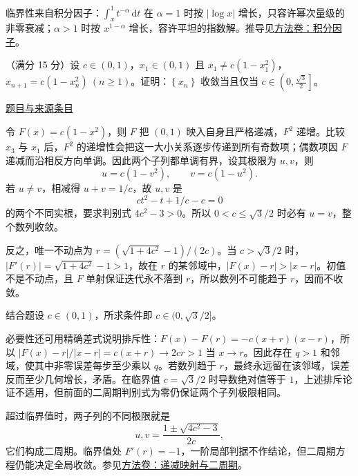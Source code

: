 \documentclass[12pt,fontset=fandol]{ctexart}
\begin{document}
\begin{remark}[方法与条件]临界性来自积分因子：$\int_x^1t^{-\alpha}\,\mathrm dt$ 在 $\alpha=1$ 时按 $|\log x|$ 增长，只容许幂次量级的非零衰减；$\alpha>1$ 时按 $x^{1-\alpha}$ 增长，容许平坦的指数解。推导见\hyperref[app:dynamics-factor]{方法卷：积分因子}。\end{remark}

\begin{example}\label{ex:fin10-lo:8}\label{pr:fin10-lo:8}

（满分 15 分）设 $c\in(0,1)$，$x_{1}\in(0,1)$ 且 $x_{1}\neq c\left(1-x_{1}^{2}\right)$，$x_{n+1}=c\left(1-x_{n}^{2}\right)\ (n\geq1)$。证明：$\left\{x_{n}\right\}$ 收敛当且仅当 $c\in\left(0,\frac{\sqrt{3}}{2}\right]$。

\par\href{https://github.com/lzxcr/cmc-mathematics/blob/64916fa1fdbc3e444a652eca204d5669058ee321/src/problems/finals/10/08.md}{题目与来源条目}

\end{example}

\begin{solve}\label{ans:fin10-lo:8}

令 $F(x)=c(1-x^2)$，则 $F$ 把 $(0,1)$ 映入自身且严格递减，$F^2$ 递增。比较 $x_3$ 与 $x_1$ 后，$F^2$ 的递增性会把这一大小关系逐步传递到所有奇数项；偶数项因 $F$ 递减而沿相反方向单调。因此两个子列都单调有界，设其极限为 $u,v$，则
\[
u=c(1-v^2),\qquad v=c(1-u^2).
\]
若 $u\ne v$，相减得 $u+v=1/c$，故 $u,v$ 是
\[
ct^2-t+1/c-c=0
\]
的两个不同实根，要求判别式 $4c^2-3>0$。所以 $0<c\leq\sqrt3/2$ 时必有 $u=v$，整个数列收敛。

反之，唯一不动点为 $r=(\sqrt{1+4c^2}-1)/(2c)$。当 $c>\sqrt3/2$ 时，$|F'(r)|=\sqrt{1+4c^2}-1>1$，故在 $r$ 的某邻域中，$|F(x)-r|>|x-r|$。初值不是不动点，且 $F$ 单射保证迭代永不落到 $r$，所以数列不可能趋于 $r$，因而不收敛。

结合题设 $c\in(0,1)$，所求条件即 $c\in(0,\sqrt3/2]$。

必要性还可用精确差式说明排斥性：$F(x)-F(r)=-c(x+r)(x-r)$，所以 $|F(x)-r|/|x-r|=c(x+r)\to2cr>1$ 当 $x\to r$。因此存在 $q>1$ 和邻域，使其中非零误差每步至少乘以 $q$。若数列趋于 $r$，最终永远留在该邻域，误差反而至少几何增长，矛盾。在临界值 $c=\sqrt3/2$ 时导数绝对值等于 $1$，上述排斥论证不适用，但前面的二周期判别式为零仍保证两个子列极限相同。

\end{solve}

\begin{remark}[方法与条件]超过临界值时，两子列的不同极限就是
\[
u,v=\frac{1\pm\sqrt{4c^2-3}}{2c},
\]
它们构成二周期。临界值处 $F'(r)=-1$，一阶局部判据不作结论，但二周期方程仍能决定全局收敛。参见\hyperref[app:dynamics-iteration]{方法卷：递减映射与二周期}。\end{remark}
\end{document}
